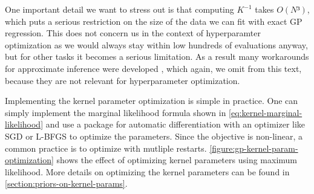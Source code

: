 One important detail we want to stress out is that computing $K^{-1}$ takes
$O(N³)$, which puts a serious restriction on the size of the data we can fit
with exact GP regression. This does not concern us in the context of
hyperparamter optimization as we would always stay within low hundreds of
evaluations anyway, but for other tasks it becomes a serious limitation. As a
result many workarounds for approximate inference were developed
\citep{williams2006gaussian}, which again, we omit from this text, because they
are not relevant for hyperparameter optimization.

Implementing the kernel parameter optimization is simple in practice. One can
simply implement the marginal likelihood formula shown in
\autoref{eq:kernel-marginal-likelihood}  and
use a package for automatic differentiation with an optimizer like SGD or
L-BFGS to optimize the parameters. Since the objective is non-linear, a common
practice \citep{gpy2014} is to optimize with mutliple restarts.
\autoref{figure:gp-kernel-param-optimization} shows the effect of optimizing
kernel parameters using maximum likelihood. More details on optimizing the kernel
parameters can be found in \autoref{section:priors-on-kernel-params}.
